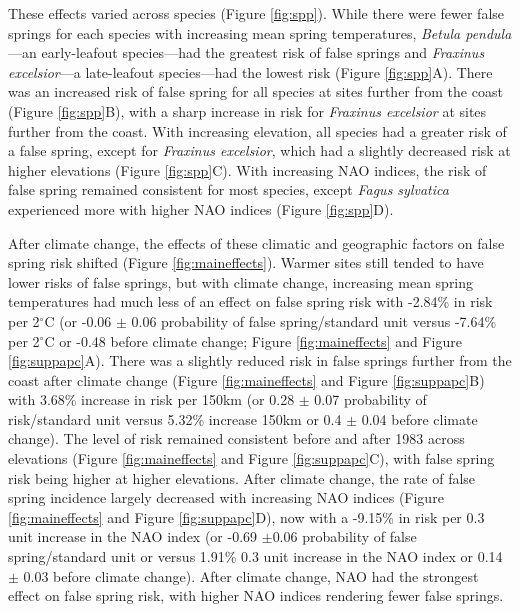 \documentclass{article}\usepackage[]{graphicx}\usepackage[]{color}
\begin{document}
These effects varied across species (Figure \ref{fig:spp}). While there were fewer false springs for each species with increasing mean spring temperatures,  \textit{Betula pendula}---an early-leafout species---had the greatest risk of false springs and \textit{Fraxinus excelsior}---a late-leafout species---had the lowest risk (Figure \ref{fig:spp}A). There was an increased risk of false spring for all species at sites further from the coast (Figure \ref{fig:spp}B), with a sharp increase in risk for \textit{Fraxinus excelsior} at sites further from the coast. With increasing elevation, all species had a greater risk of a false spring, except for \textit{Fraxinus excelsior}, which had a slightly decreased risk at higher elevations (Figure \ref{fig:spp}C).  With increasing NAO indices, the risk of false spring remained consistent for most species, except \textit{Fagus sylvatica} experienced more with higher NAO indices (Figure \ref{fig:spp}D). 

After climate change, the effects of these climatic and geographic factors on false spring risk shifted (Figure \ref{fig:maineffects}). Warmer sites still tended to have lower risks of false springs, but with climate change, increasing mean spring temperatures had much less of an effect on false spring risk with -2.84\% in risk per 2$^{\circ}$C (or -0.06 $\pm$ 0.06 probability of false spring/standard unit versus -7.64\% per 2$^{\circ}$C or -0.48 before climate change; Figure \ref{fig:maineffects} and Figure \ref{fig:suppapc}A). There was a slightly reduced risk in false springs further from the coast after climate change (Figure \ref{fig:maineffects} and Figure \ref{fig:suppapc}B) with 3.68\% increase in risk per 150km (or 0.28 $\pm$ 0.07 probability of risk/standard unit versus 5.32\% increase 150km or 0.4 $\pm$ 0.04 before climate change). The level of risk remained consistent before and after 1983 across elevations (Figure \ref{fig:maineffects} and Figure \ref{fig:suppapc}C), with false spring risk being higher at higher elevations. After climate change, the rate of false spring incidence largely decreased with increasing NAO indices (Figure \ref{fig:maineffects} and Figure \ref{fig:suppapc}D), now with a -9.15\% in risk per 0.3 unit increase in the NAO index (or -0.69 $\pm$0.06 probability of false spring/standard unit or versus 1.91\% 0.3 unit increase in the NAO index or 0.14 $\pm$ 0.03 before climate change). After climate change, NAO had the strongest effect on false spring risk, with higher NAO indices rendering fewer false springs.
\end{document}
